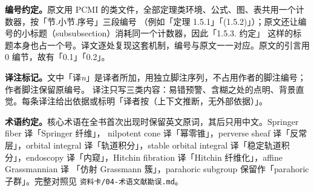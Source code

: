 \documentclass[UTF8, a4paper, 12pt, fontset=fandol, scheme=chinese]{ctexart}
\begin{document}
\textbf{编号约定。}原文用 PCMI 的类文件，全部定理类环境、公式、图、表共用一个计数器，按「节.小节.序号」三段编号
（例如「定理 1.5.1」「(1.5.2)」）；原文还让编号的小标题（subsubsection）消耗同一个计数器，因此「1.5.3. 约定」
这样的标题本身也占一个号。译文逐处复现这套机制，编号与原文一一对应。原文的引言用 0 编节，故有「0.1」「0.2」。

\textbf{译注标记。}文中「译\emph{n}」是译者所加，用独立脚注序列，不占用作者的脚注编号；作者脚注保留原编号。
译注只写三类内容：易错预警、含糊之处的点明、背景直觉。每条译注给出依据或标明「译者按（上下文推断，无外部依据）」。

\textbf{术语约定。}核心术语在全书首次出现时保留英文原词，其后只用中文。Springer fiber 译「Springer 纤维」，
nilpotent cone 译「幂零锥」，perverse sheaf 译「反常层」，orbital integral 译「轨道积分」，stable orbital integral
译「稳定轨道积分」，endoscopy 译「内窥」，Hitchin fibration 译「Hitchin 纤维化」，affine Grassmannian 译
「仿射 Grassmann 簇」，parahoric subgroup 保留作「parahoric 子群」。完整对照见 \verb|资料卡/04-术语文献勘误.md|。

\newpage
\tableofcontents
\newpage

\setcounter{section}{-1}




















\clearpage
{}
{}

\end{document}
